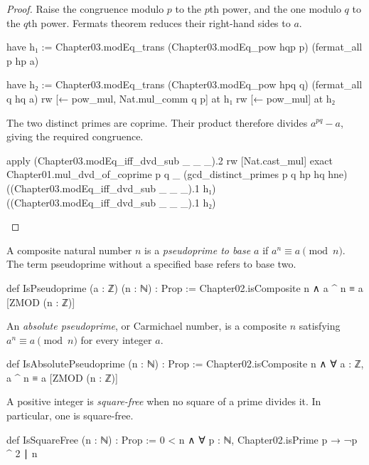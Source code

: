 \begin{proof}
  Raise the congruence modulo $p$ to the $p$th power, and the one modulo $q$ to the $q$th power.
  Fermat\textquotesingle s theorem reduces their right-hand sides to $a$.

  \begin{lean}
    have h₁ := Chapter03.modEq_trans (Chapter03.modEq_pow hqp p) (fermat_all p hp a)

    have h₂ := Chapter03.modEq_trans (Chapter03.modEq_pow hpq q) (fermat_all q hq a)
    rw [← pow_mul, Nat.mul_comm q p] at h₁
    rw [← pow_mul] at h₂
  \end{lean}

  The two distinct primes are coprime.
  Their product therefore divides $a^{pq}-a$, giving the required congruence.

  \begin{lean}
    apply (Chapter03.modEq_iff_dvd_sub _ _ _).2
    rw [Nat.cast_mul]
    exact Chapter01.mul_dvd_of_coprime p q _ (gcd_distinct_primes p q hp hq hne)
      ((Chapter03.modEq_iff_dvd_sub _ _ _).1 h₁) ((Chapter03.modEq_iff_dvd_sub _ _ _).1 h₂)
  \end{lean}
\end{proof}

\begin{definition}
  A composite natural number $n$ is a \emph{pseudoprime to base $a$} if $a^n\equiv a\pmod n$.
  The term pseudoprime without a specified base refers to base two.

  \begin{lean}
    def IsPseudoprime (a : ℤ) (n : ℕ) : Prop :=
      Chapter02.isComposite n ∧ a ^ n ≡ a [ZMOD (n : ℤ)]
  \end{lean}
\end{definition}

\begin{definition}
  An \emph{absolute pseudoprime}, or Carmichael number, is a composite $n$ satisfying $a^n\equiv
    a\pmod n$ for every integer $a$.

  \begin{lean}
    def IsAbsolutePseudoprime (n : ℕ) : Prop :=
      Chapter02.isComposite n ∧ ∀ a : ℤ, a ^ n ≡ a [ZMOD (n : ℤ)]
  \end{lean}
\end{definition}

\begin{definition}
  A positive integer is \emph{square-free} when no square of a prime divides it.
  In particular, one is square-free.

  \begin{lean}
    def IsSquareFree (n : ℕ) : Prop :=
      0 < n ∧ ∀ p : ℕ, Chapter02.isPrime p → ¬p ^ 2 ∣ n
  \end{lean}
\end{definition}

